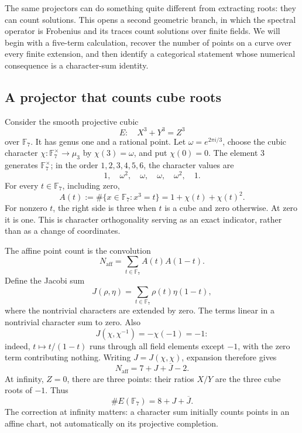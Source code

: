 \documentclass[11pt]{article}
\theoremstyle{remark}
\begin{document}
The same projectors can do something quite different from extracting roots: they can count solutions. This opens a second geometric branch, in which the spectral operator is Frobenius and its traces count solutions over finite fields. We will begin with a five-term calculation, recover the number of points on a curve over every finite extension, and then identify a categorical statement whose numerical consequence is a character-sum identity.

\subsection{A projector that counts cube roots}

Consider the smooth projective cubic
\[
E:\quad X^3+Y^3=Z^3
\]
over \(\mathbb F_7\). It has genus one and a rational point. Let \(\omega=e^{2\pi i/3}\), choose the cubic character \(\chi:\mathbb F_7^\times\to\mu_3\) by \(\chi(3)=\omega\), and put \(\chi(0)=0\). The element \(3\) generates \(\mathbb F_7^\times\); in the order \(1,2,3,4,5,6\), the character values are
\[
1,\quad\omega^2,\quad\omega,\quad\omega,
\quad\omega^2,\quad1.
\]
For every \(t\in\mathbb F_7\), including zero,
\begin{equation}
A(t):=\#\{x\in\mathbb F_7:x^3=t\}
=1+\chi(t)+\chi(t)^2.
\label{fermat:cube-projector}
\end{equation}
For nonzero \(t\), the right side is three when \(t\) is a cube and zero otherwise. At zero it is one. This is character orthogonality serving as an exact indicator, rather than as a change of coordinates.

The affine point count is the convolution
\[
N_{\mathrm{aff}}=\sum_{t\in\mathbb F_7}A(t)A(1-t).
\]
Define the Jacobi sum
\[
J(\rho,\eta)=\sum_{t\in\mathbb F_7}\rho(t)\eta(1-t),
\]
where the nontrivial characters are extended by zero. The terms linear in a nontrivial character sum to zero. Also
\[
J(\chi,\chi^{-1})=-\chi(-1)=-1:
\]
indeed, \(t\mapsto t/(1-t)\) runs through all field elements except \(-1\), with the zero term contributing nothing. Writing \(J=J(\chi,\chi)\), expansion therefore gives
\[
N_{\mathrm{aff}}=7+J+\overline J-2.
\]
At infinity, \(Z=0\), there are three points: their ratios \(X/Y\) are the three cube roots of \(-1\). Thus
\begin{equation}
\#E(\mathbb F_7)=8+J+\overline J.
\label{fermat:count-jacobi}
\end{equation}
The correction at infinity matters: a character sum initially counts points in an affine chart, not automatically on its projective completion.
\end{document}
